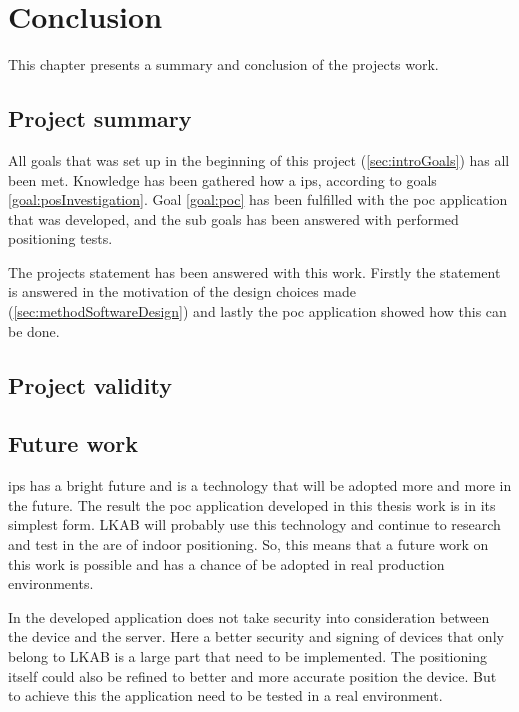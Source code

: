 \chapter{Conclusion}\label{sec:Conclusion}
This chapter presents a summary and conclusion of the projects work.


\section{Project summary}\label{sec:conclusionProjectSummary}
All goals that was set up in the beginning of this project (\cref{sec:introGoals}) has all been met.
Knowledge has been gathered how a \acrfull{ips}, according to goals \ref{goal:posInvestigation}.
Goal \ref{goal:poc} has been fulfilled with the \acrshort{poc} application that was developed, and the sub goals has been answered with performed positioning tests.

\bigskip

The projects statement has been answered with this work.
Firstly the statement is answered in the motivation of the design choices made (\cref{sec:methodSoftwareDesign}) and lastly the \acrshort{poc} application showed how this can be done.

\section{Project validity}\label{sec:conclusionProjectValidity}


\section{Future work}\label{sec:conclusionFutureWork}
\Acrfull{ips} has a bright future and is a technology that will be adopted more and more in the future.
The result the \acrfull{poc} application developed in this thesis work is in its simplest form.
LKAB will probably use this technology and continue to research and test in the are of indoor positioning.
So, this means that a future work on this work is possible and has a chance of be adopted in real production environments.

\bigskip

In the developed application does not take security into consideration between the device and the server.
Here a better security and signing of devices that only belong to LKAB is a large part that need to be implemented.
The positioning itself could also be refined to better and more accurate position the device. 
But to achieve this the application need to be tested in a real environment.

